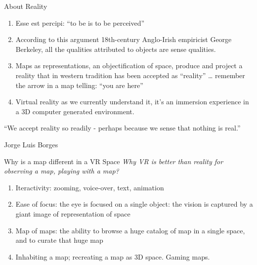 \documentclass{beamer}
\begin{document}
\begin{frame}{About Reality}
	\begin{enumerate}
		\item Esse est percipi: ``to be is to be perceived''
		\item According to this argument 18th-century Anglo-Irish empiricist George Berkeley, all the qualities attributed to objects are sense qualities.

		\item Maps as representations, an objectification of space, produce and project a reality that in western tradition has been accepted as ``reality'' … remember the arrow in a map telling: ``you are here''

		\item Virtual reality as we currently understand it, it’s an immersion experience in a 3D computer generated environment. 
	\end{enumerate}

	``We accept reality so readily - perhaps because we sense that nothing is real.''\par
	\hfill Jorge Luis Borges \par
\end{frame}

\begin{frame}{Why is a map different in a VR Space}
	\textit{Why VR is better than reality for observing a map, playing with a map?}
	\begin{enumerate}
		\item Iteractivity: zooming, voice-over, text, animation
		\item Ease of focus: the eye is focused on a single object: the
			vision is captured by a giant image of representation of space
		\item Map of maps: the ability to browse a huge catalog of map in a single
			space, and to curate that huge map
		\item Inhabiting a map; recreating a map as 3D space. Gaming maps.
	\end{enumerate}
\end{frame}
\end{document}

